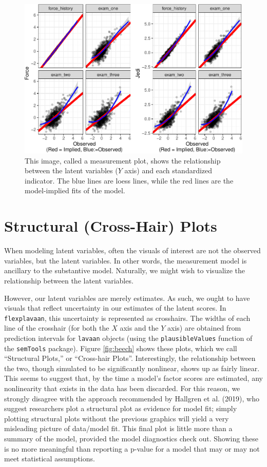 \documentclass[
  english,
  doc]{apa6}
\begin{document}
\begin{figure}
\centering
\includegraphics{flexplavaan_draft_files/figure-latex/measurementplot-1.pdf}
\caption{\label{fig:measurementplot}This image, called a measurement plot, shows the relationship between the latent variables (\(Y\) axis) and each standardized indicator. The blue lines are loess lines, while the red lines are the model-implied fits of the model.}
\end{figure}

\hypertarget{structural-cross-hair-plots}{%
\section{Structural (Cross-Hair) Plots}\label{structural-cross-hair-plots}}

When modeling latent variables, often the visuals of interest are not the observed variables, but the latent variables. In other words, the measurement model is ancillary to the substantive model. Naturally, we might wish to visualize the relationship between the latent variables.

However, our latent variables are merely estimates. As such, we ought to have visuals that reflect uncertainty in our estimates of the latent scores. In \texttt{flexplavaan}, this uncertainty is represented as crosshairs. The widths of each line of the crosshair (for both the \(X\) axis and the \(Y\) axis) are obtained from prediction intervals for \texttt{lavaan} objects (using the \texttt{plausibleValues} function of the \texttt{semTools} package). Figure \ref{fig:beech} shows these plots, which we call ``Structural Plots,'' or ``Cross-hair Plots''. Interestingly, the relationship between the two, though simulated to be significantly nonlinear, shows up as fairly linear. This seems to suggest that, by the time a model's factor scores are estimated, any nonlinearity that exists in the data has been discarded. For this reason, we strongly disagree with the approach recommended by Hallgren et al. (2019), who suggest researchers plot a structural plot as evidence for model fit; simply plotting structural plots without the previous graphics will yield a very misleading picture of data/model fit. This final plot is little more than a summary of the model, provided the model diagnostics check out. Showing these is no more meaningful than reporting a p-value for a model that may or may not meet statistical assumptions.
\end{document}

